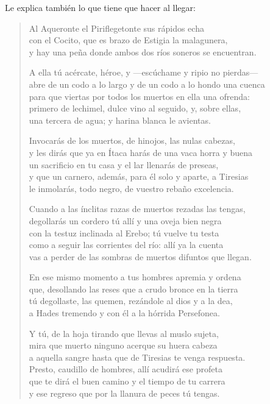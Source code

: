 \documentclass[11pt,a4paper]{article}
\begin{document}
Le explica también lo que tiene que hacer al llegar:

\begin{verse}
Al Aqueronte el Piriflegetonte sus rápidos echa\\
con el Cocito, que es brazo de Estigia la malagunera,\\
y hay una peña donde ambos dos ríos soneros se encuentran.

A ella tú acércate, héroe, y ---escúchame y ripio no pierdas---\\
abre de un codo a lo largo y de un codo a lo hondo una cuenca\\
para que viertas por todos los muertos en ella una ofrenda:\\
primero de lechimel, dulce vino al seguido, y, sobre ellas,\\
una tercera de agua; y harina blanca le avientas.

Invocarás de los muertos, de hinojos, las nulas cabezas,\\
y les dirás que ya en Ítaca harás de una vaca horra y buena\\
un sacrificio en tu casa y el lar llenarás de preseas,\\
y que un carnero, además, para él solo y aparte, a Tiresias\\
le inmolarás, todo negro, de vuestro rebaño excelencia.

Cuando a las ínclitas razas de muertos rezadas las tengas,\\
degollarás un cordero tú allí y una oveja bien negra\\
con la testuz inclinada al Erebo; tú vuelve tu testa\\
como a seguir las corrientes del río: allí ya la cuenta\\
vas a perder de las sombras de muertos difuntos que llegan.

En ese mismo momento a tus hombres apremia y ordena\\
que, desollando las reses que a crudo bronce en la tierra\\
tú degollaste, las quemen, rezándole al dios y a la dea,\\
a Hades tremendo y con él a la hórrida Persefonea.

Y tú, de la hoja tirando que llevas al muslo sujeta,\\
mira que muerto ninguno acerque su huera cabeza\\
a aquella sangre hasta que de Tiresias te venga respuesta.\\
Presto, caudillo de hombres, allí acudirá ese profeta\\
que te dirá el buen camino y el tiempo de tu carrera\\
y ese regreso que por la llanura de peces tú tengas.
\end{verse}
\end{document}
